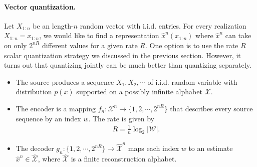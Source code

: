 \documentclass{article}
\numberwithin{equation}{section}
\renewcommand{\cal}{\mathcal}
\newcommand{\wh}{\widehat}
\theoremstyle{plain}
\theoremstyle{definition}
\begin{document}
\paragraph{Vector quantization.} Let $X_{1:n}$ be an length-$n$ random vector with i.i.d. entries. For every realization $X_{1:n} = x_{1:n}$, we would like to find a representation $\hat{x}^n(x_{1:n})$ where $\hat{x}^n$
can take on only $2^{nR}$ different values for a given rate $R$. One option is to use the rate $R$ scalar quantization strategy we discussed in the previous section. However, it turns out that quantizing jointly can be much better than quantizing separately.
\vspace{0.3cm}
\begin{center}
\end{center}
\vspace{0.3cm}
\begin{itemize}
\item The source produces a sequence $X_1, X_2, \cdots$ of i.i.d. random variable with distribution $p(x)$ supported on a possibly infinite alphabet $\cal{X}$.
\item The encoder is a mapping $f_n:\cal{X}^n\to\{1,2,\cdots,2^{nR}\}$ that describes every source sequence by an index $w$. The rate is given by
\begin{align*}
	R=\frac{1}{n}\log_2\left\vert\cal{W}\right\vert. 
\end{align*}
\item The decoder $g_n:\{1,2,\cdots,2^{nR}\}\to\wh{\cal{X}}^n$ maps each index $w$ to an estimate $\hat{x}^n\in\wh{\cal{X}}$, where $\wh{\cal{X}}$ is
a finite reconstruction alphabet.
\end{itemize}
\end{document}
